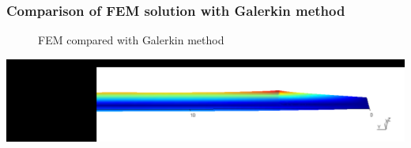 \documentclass[9pt]{beamer}
\begin{document}
\begin{frame}
\begin{figure}[h!]










\end{figure}
\end{frame}



\begin{frame}
\frametitle{Comparison of FEM solution with Galerkin method }

\begin{figure}

\subfloat{}
\caption{FEM compared with Galerkin method}
\end{figure}



\href{run:images/galcomp.mpg}{\includegraphics[width=1.0\textwidth,trim={10.5cm 0cm 0cm 2cm},clip]{images/galcomp.png}}
\end{frame}
\end{document}
